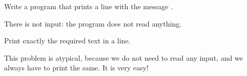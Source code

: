 
\Statement

Write a program that prints a line with the message .

\Input

There is not input: the program does not read anything.

\Output

Print exactly the required text in a line.

\Observation

This problem is atypical, because we do not need to read any input,
and we always have to print the same. It is very easy!

\Sample
